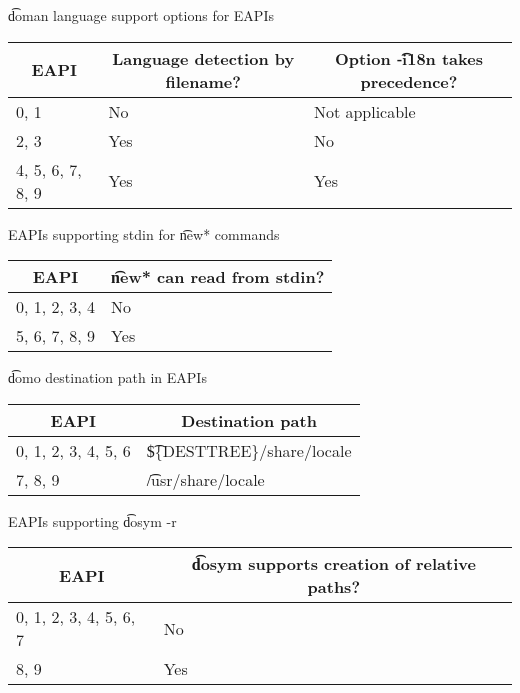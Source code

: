 \begin{centertable}{\t{doman} language support options for EAPIs}
    \label{tab:doman-table}
    \begin{tabular}{lll}
      \toprule
      \multicolumn{1}{c}{\textbf{EAPI}} &
      \multicolumn{1}{c}{\textbf{Language detection by filename?}} &
      \multicolumn{1}{c}{\textbf{Option \t{-i18n} takes precedence?}} \\
      \midrule
      0, 1              & No  & Not applicable \\
      2, 3              & Yes & No             \\
      4, 5, 6, 7, 8, 9  & Yes & Yes            \\
      \bottomrule
    \end{tabular}
\end{centertable}

\begin{centertable}{EAPIs supporting stdin for \t{new*} commands}
    \label{tab:newfoo-stdin-table}
    \begin{tabular}{ll}
      \toprule
      \multicolumn{1}{c}{\textbf{EAPI}} &
      \multicolumn{1}{c}{\textbf{\t{new*} can read from stdin?}} \\
      \midrule
      0, 1, 2, 3, 4     & No  \\
      5, 6, 7, 8, 9     & Yes \\
      \bottomrule
    \end{tabular}
\end{centertable}

\begin{centertable}{\t{domo} destination path in EAPIs}
    \label{tab:domo-path}
    \begin{tabular}{ll}
      \toprule
      \multicolumn{1}{c}{\textbf{EAPI}} &
      \multicolumn{1}{c}{\textbf{Destination path}} \\
      \midrule
      0, 1, 2, 3, 4, 5, 6 & \t{\$\{DESTTREE\}/share/locale} \\
      7, 8, 9             & \t{/usr/share/locale} \\
      \bottomrule
    \end{tabular}
\end{centertable}

\begin{centertable}{EAPIs supporting \t{dosym -r}}
    \label{tab:dosym-r}
    \begin{tabular}{ll}
      \toprule
      \multicolumn{1}{c}{\textbf{EAPI}} &
      \multicolumn{1}{c}{\textbf{\t{dosym} supports creation of relative paths?}} \\
      \midrule
      0, 1, 2, 3, 4, 5, 6, 7  & No  \\
      8, 9                    & Yes \\
      \bottomrule
    \end{tabular}
\end{centertable}

